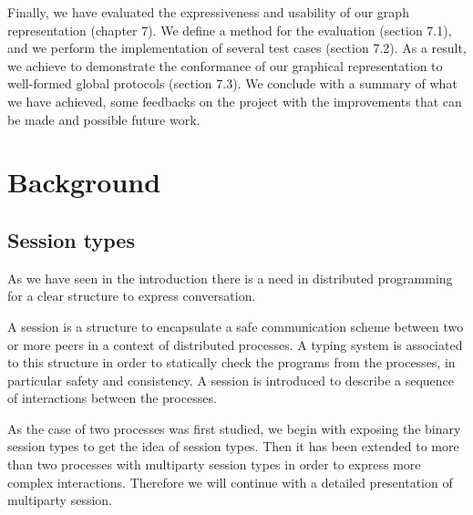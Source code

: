 \documentclass[a4paper,11pt,twoside]{report}
\begin{document}
Finally, we have evaluated the expressiveness and usability of our graph representation (chapter 7). We define a method for the evaluation (section 7.1), and we perform the implementation of several test cases (section 7.2). As a result, we achieve to demonstrate the conformance of our graphical representation to well-formed global protocols (section 7.3). We conclude with a summary of what we have achieved, some feedbacks on the project with the improvements that can be made and possible future work.


\chapter{Background}



\section{Session types}

As we have seen in the introduction there is a need in distributed programming for a clear structure to express conversation.

A session is a structure to encapsulate a safe communication scheme between two or more peers in a context of distributed processes. A typing system is associated to this structure in order to statically check the programs from the processes, in particular safety and consistency.
A session is introduced to describe a sequence of interactions between the processes.

As the case of two processes was first studied, we begin with exposing the binary session types to get the idea of session types. Then it has been extended to more than two processes with multiparty session types in order to express more complex interactions. Therefore we will continue with a detailed presentation of multiparty session.
\end{document}
